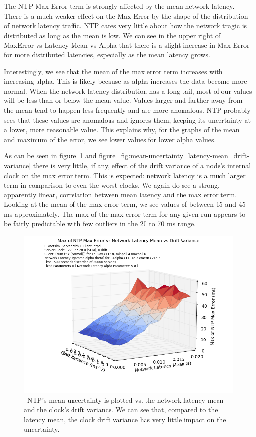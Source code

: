 The NTP Max Error term is strongly affected by the mean network
latency. There is a much weaker effect on the Max Error by the shape
of the distribution of network latency traffic. NTP cares very little
about how the network tragic is distributed as long as the mean is
low. We can see in the upper right of MaxError vs Latency Mean vs
Alpha that there is a slight increase in Max Error for more
distributed latencies, especially as the mean latency grows.

Interestingly, we see that the mean of the max error term increases
with increasing alpha. This is likely because as alpha increases the
data become more normal. When the network latency distribution has a
long tail, most of our values will be less than or below the mean
value. Values larger and farther away from the mean tend to happen
less frequently and are more anomalous. NTP probably sees that these
values are anomalous and ignores them, keeping its uncertainty at a
lower, more reasonable value. This explains why, for the graphs of the
mean and maximum of the error, we see lower values for lower alpha
values.

As can be seen in figure~\ref{fig:max-uncertainty_latency-mean_drift-variance} and 
figure~\ref{fig:mean-uncertainty_latency-mean_drift-variance} there is very little, if any,
effect of the drift variance of a node's internal clock on the max
error term. This is expected: network latency is a much larger term in
comparison to even the worst clocks. We again do see a strong,
apparently linear, correlation between mean latency and the max error
term. Looking at the mean of the max error term, we see values of
between 15 and 45 ms approximately. The max of the max error term for
any given run appears to be fairly predictable with few outliers in
the 20 to 70 ms range. 

\begin{figure}[t]
  \caption{~NTP's mean uncertainty is plotted vs. the network latency mean and the clock's drift variance. We can see that, compared to the latency mean, the clock drift variance has very little impact on the uncertainty.}
  \label{fig:max-uncertainty_latency-mean_drift-variance}
  \includegraphics[width=0.8\linewidth]{max_max_err-mean_latency-drift_variance.png}
\end{figure}

